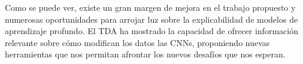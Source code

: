 Como se puede ver, existe un gran margen de mejora en el trabajo propuesto y
numerosas oportunidades para arrojar luz sobre la explicabilidad de modelos de
aprendizaje profundo. El TDA ha mostrado la capacidad de ofrecer información relevante
sobre cómo modifican los datos las CNNs, proponiendo nuevas herramientas que nos
permitan afrontar los nuevos desafíos que nos esperan.

\endinput
